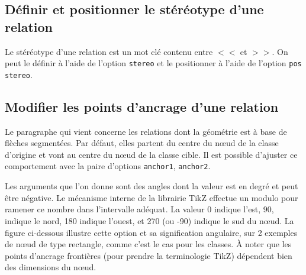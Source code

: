 \documentclass[a4paper,11pt]{report}
\newcommand{\inputTikZ}[1]{%
  }%
\newcommand{\inputTikZ}[1]{%
    \texttt{[image: fig/\#1.pdf]}%
  }%
\newcommand{\TikZ}{{\sc TikZ}}
\begin{document}
\subsection{Définir et positionner le stéréotype d'une relation}\label{ss.relstereo}

Le stéréotype d'une relation est un mot clé contenu entre $<<$ et $>>$. On peut le définir à l'aide de l'option {\tt stereo} et le positionner à l'aide de l'option \hypertarget{posstereo}{{\tt pos stereo}}.

\medskip

\begin{minipage}{0.5\textwidth}

\end{minipage}
\begin{minipage}{0.4\textwidth}
\begin{center}
\inputTikZ{relationstereo}
\end{center}
\end{minipage}

\subsection{Modifier les points d'ancrage d'une relation}\label{ss.relanchor}

Le paragraphe qui vient concerne les relations dont la géométrie est à base de flèches segmentées. Par défaut, elles partent du centre du n\oe{}ud de la classe d'origine et vont au centre du n\oe{}ud de la classe cible. Il est possible d'ajuster ce comportement avec la paire d'options \hypertarget{anchor1}{{\tt anchor1}}, \hypertarget{anchor2}{{\tt anchor2}}.

\medskip

\begin{minipage}{0.6\textwidth}

\end{minipage}
\begin{minipage}{0.4\textwidth}
\begin{center}
\inputTikZ{relationanchor}
\end{center}
\end{minipage}

\medskip

Les arguments que l'on donne sont des angles dont la valeur est en degré et peut être négative. Le mécanisme interne de la librairie \TikZ{} effectue un modulo pour ramener ce nombre dans l'intervalle adéquat. La valeur 0 indique l'est, 90, indique le nord, 180 indique l'ouest, et 270 (ou -90) indique le sud du n\oe{}ud. La figure ci-dessous illustre cette option et sa signification angulaire, sur 2 exemples de n\oe{}ud de type rectangle, comme c'est le cas pour les classes. \`{A} noter que les points d'ancrage frontières (pour prendre la terminologie \TikZ) dépendent bien des dimensions du n\oe{}ud.
\end{document}
